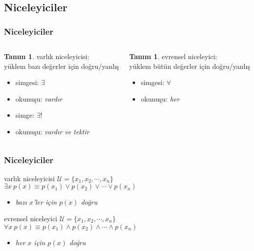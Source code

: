 \documentclass[dvipsnames]{beamer}
\theoremstyle{definition}
\newtheorem{tanim}[theorem]{Tanım}
\theoremstyle{example}
\theoremstyle{plain}
\begin{document}
\subsection{Niceleyiciler}

\begin{frame}
  \frametitle{Niceleyiciler}

  \begin{columns}[t]
    \begin{tanim}
      \alert{varlık niceleyicisi}:\\
        yüklem bazı değerler için doğru/yanlış

      \begin{itemize}
        \item simgesi: $\exists$
        \item okunuşu: \emph{vardır}

        \pause
        \medskip
        \item simge: $\exists!$
        \item okunuşu: \emph{vardır ve tektir}
      \end{itemize}
    \end{tanim}

    \pause
    \begin{tanim}
      \alert{evrensel niceleyici}:\\
        yüklem bütün değerler için doğru/yanlış

      \begin{itemize}
        \item simgesi: $\forall$
        \item okunuşu: \emph{her}
      \end{itemize}
    \end{tanim}
  \end{columns}
\end{frame}

\begin{frame}
  \frametitle{Niceleyiciler}

  \begin{block}{varlık niceleyicisi}
    $\mathcal{U} = \{x_1,x_2,\cdots,x_n\}$\\
    $\exists x~p(x) \equiv p(x_1) \vee p(x_2) \vee \cdots \vee p(x_n)$

    \begin{itemize}
      \item \emph{bazı $x$'ler için $p(x)$ doğru}
    \end{itemize}
  \end{block}

  \pause
  \begin{block}{evrensel niceleyici}
    $\mathcal{U} = \{x_1,x_2,\cdots,x_n\}$\\
    $\forall x~p(x) \equiv p(x_1) \wedge p(x_2) \wedge \cdots \wedge p(x_n)$

    \begin{itemize}
      \item \emph{her $x$ için $p(x)$ doğru}
    \end{itemize}
  \end{block}
\end{frame}
\end{document}
